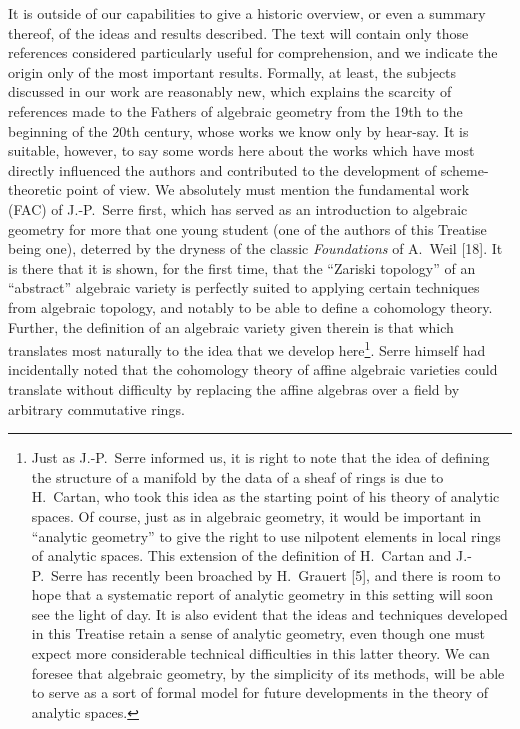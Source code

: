 \documentclass[../main.tex]{subfiles}
\begin{document}
\asttri

It is outside of our capabilities to give a historic overview, or even a summary thereof, of the ideas and results described.
The text will contain only those references considered particularly useful for comprehension, and we indicate the origin only of the most important results.
Formally, at least, the subjects discussed in our work are reasonably new, which explains the scarcity of references made to the Fathers of algebraic geometry from the 19th to the beginning of the 20th century, whose works we know only by hear-say.
It is suitable, however, to say some words here about the works which have most directly influenced the authors and contributed to the development of scheme-theoretic point of view.
We absolutely must mention the fundamental work (FAC) of J.-P.~Serre first, which has served as an introduction to algebraic geometry for more that one young student (one of the authors of this Treatise being one), deterred by the dryness of the classic \emph{Foundations} of A.~Weil [18].
It is there that it is shown, for the first time, that the ``Zariski topology'' of an ``abstract'' algebraic variety is perfectly suited to applying certain techniques from algebraic topology, and notably to be able to define a cohomology theory.
Further, the definition of an algebraic variety given therein is that which translates most naturally to the idea that we develop here\footnote[1]{Just as J.-P.~Serre informed us, it is right to note that the idea of defining the structure of a manifold by the data of a sheaf of rings is due to H.~Cartan, who took this idea as the starting point of his theory of analytic spaces. Of course, just as in algebraic geometry, it would be important in ``analytic geometry'' to give the right to use nilpotent elements in local rings of analytic spaces. This extension of the definition of H.~Cartan and J.-P.~Serre has recently been broached by H.~Grauert [5], and there is room to hope that a systematic report of analytic geometry in this setting will soon see the light of day. It is also evident that the ideas and techniques developed in this Treatise retain a sense of analytic geometry, even though one must expect more considerable technical difficulties in this latter theory. We can foresee that algebraic geometry, by the simplicity of its methods, will be able to serve as a sort of formal model for future developments in the theory of analytic spaces.}.
Serre himself had incidentally noted that the cohomology theory of affine algebraic varieties could translate without difficulty by replacing the affine algebras over a field by arbitrary commutative rings.
\end{document}
